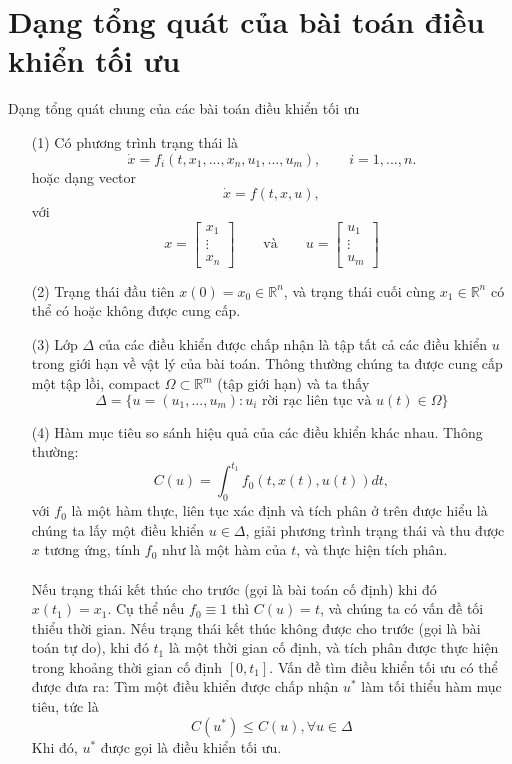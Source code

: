 \documentclass[12pt,a4paper]{report}
\begin{document}
\section{Dạng tổng quát của bài toán điều khiển tối ưu}
Dạng tổng quát chung của các bài toán điều khiển tối ưu
\begin{itemize}
	\item[(1)] Có phương trình trạng thái là $$\dot{x} = f_i(t, x_1, ..., x_n, u_1, ..., u_m), \qquad i = 1, ..., n. $$ hoặc dạng vector $$\dot{x} = f(t,x,u),$$ với $$x = \begin{bmatrix}
	x_1 \\ \vdots \\ x_n
	\end{bmatrix} \qquad \text{và} \qquad u = \begin{bmatrix}
	u_1 \\ \vdots \\ u_m
	\end{bmatrix}$$
	\item[(2)] Trạng thái đầu tiên $x(0) =x_0 \in \mathbb{R}^n$, và trạng thái cuối cùng $x_1 \in \mathbb{R}^n$ có thể có hoặc không được cung cấp.
	\item [(3)] Lớp $\Delta$ của các điều khiển được chấp nhận là tập tất cả các điều khiển $u$ trong giới hạn về vật lý của bài toán. Thông thường chúng ta được cung cấp một tập lồi, compact $\Omega \subset \mathbb{R}^m$ (tập giới hạn) và ta thấy $$\Delta = \{u = (u_1, ..., u_m): u_i \text { rời rạc liên tục và } u(t) \in \Omega\}$$
	\item[(4)] Hàm mục tiêu so sánh hiệu quả của các điều khiển khác nhau. Thông thường: $$C(u) = \int_{0}^{t_1}f_0(t, x(t), u(t))dt,$$ với $f_0$ là một hàm thực, liên tục xác định và tích phân ở trên được hiểu là chúng ta lấy một điều khiển $u \in \Delta$, giải phương trình trạng thái và thu được $x$ tương ứng, tính $f_0$ như là một hàm của $t$, và thực hiện tích phân.\\\\ Nếu trạng thái kết thúc cho trước (gọi là bài toán cố định) khi đó $x(t_1) = x_1$. Cụ thể nếu $f_0 \equiv 1$ thì $C(u) = t$, và chúng ta có vấn đề tối thiểu thời gian. Nếu trạng thái kết thúc không được cho trước (gọi là bài toán tự do), khi đó $t_1$ là một thời gian cố định, và tích phân được thực hiện trong khoảng thời gian cố định $[0, t_1]$. Vấn đề tìm điều khiển tối ưu có thể được đưa ra: Tìm một điều khiển được chấp nhận $u^*$ làm tối thiểu hàm mục tiêu, tức là $$C(u^*) \leq C(u), \forall u \in \Delta$$ Khi đó, $u^*$ được gọi là điều khiển tối ưu.
\end{itemize}
\end{document}
